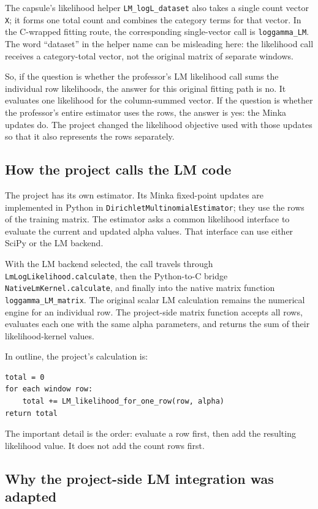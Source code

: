 \documentclass[11pt]{article}
\begin{document}
The capsule's likelihood helper \texttt{LM\_logL\_dataset} also takes a single
count vector \texttt{X}; it forms one total count and combines the category
terms for that vector. In the C-wrapped fitting route, the corresponding
single-vector call is \texttt{loggamma\_LM}. The word ``dataset'' in the helper
name can be misleading here: the likelihood call receives a category-total
vector, not the original matrix of separate windows.

So, if the question is whether the professor's LM likelihood call sums the
individual row likelihoods, the answer for this original fitting path is no.
It evaluates one likelihood for the column-summed vector. If the question is
whether the professor's entire estimator uses the rows, the answer is yes: the
Minka updates do. The project changed the likelihood objective used with those
updates so that it also represents the rows separately.

\subsection{How the project calls the LM code}

The project has its own estimator. Its Minka fixed-point updates are implemented
in Python in \texttt{DirichletMultinomialEstimator}; they use the rows of the
training matrix. The estimator asks a common likelihood interface to evaluate
the current and updated alpha values. That interface can use either SciPy or
the LM backend.

With the LM backend selected, the call travels through
\texttt{LmLogLikelihood.calculate}, then the Python-to-C bridge
\texttt{NativeLmKernel.calculate}, and finally into the native matrix function
\texttt{loggamma\_LM\_matrix}. The original scalar LM calculation remains the
numerical engine for an individual row. The project-side matrix function
accepts all rows, evaluates each one with the same alpha parameters, and returns
the sum of their likelihood-kernel values.

In outline, the project's calculation is:
\begin{verbatim}
total = 0
for each window row:
    total += LM_likelihood_for_one_row(row, alpha)
return total
\end{verbatim}
The important detail is the order: evaluate a row first, then add the resulting
likelihood value. It does not add the count rows first.

\subsection{Why the project-side LM integration was adapted}
\end{document}
